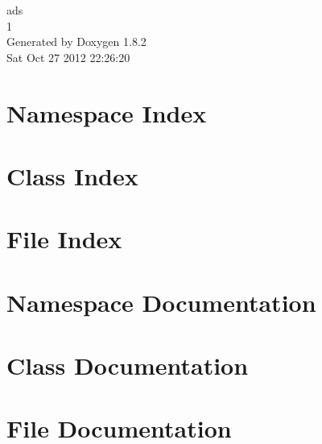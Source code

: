 \documentclass{book}
\begin{document}
\hypersetup{pageanchor=false,citecolor=blue}
\begin{titlepage}
\vspace*{7cm}
\begin{center}
{\Large ads \\[1ex]\large 1 }\\
\vspace*{1cm}
{\large Generated by Doxygen 1.8.2}\\
\vspace*{0.5cm}
{\small Sat Oct 27 2012 22:26:20}\\
\end{center}
\end{titlepage}
\clearemptydoublepage
{}
\tableofcontents
\clearemptydoublepage
{}
\hypersetup{pageanchor=true,citecolor=blue}
\chapter{Namespace Index}

\chapter{Class Index}

\chapter{File Index}

\chapter{Namespace Documentation}






\chapter{Class Documentation}
















\chapter{File Documentation}







\printindex
\end{document}
